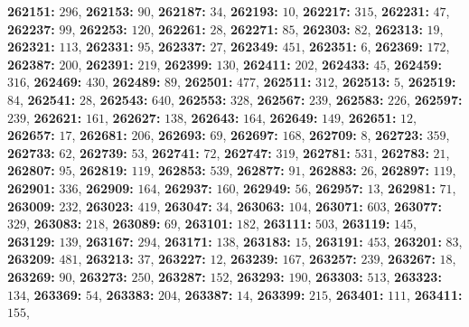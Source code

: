 \textsf{\bfseries 262151:} $296$, \textsf{\bfseries 262153:} $90$, \textsf{\bfseries 262187:} $34$, \textsf{\bfseries 262193:} $10$, \textsf{\bfseries 262217:} $315$, \textsf{\bfseries 262231:} $47$, \textsf{\bfseries 262237:} $99$, \textsf{\bfseries 262253:} $120$, \textsf{\bfseries 262261:} $28$, \textsf{\bfseries 262271:} $85$, \textsf{\bfseries 262303:} $82$, \textsf{\bfseries 262313:} $19$, \textsf{\bfseries 262321:} $113$, \textsf{\bfseries 262331:} $95$, \textsf{\bfseries 262337:} $27$, \textsf{\bfseries 262349:} $451$, \textsf{\bfseries 262351:} $6$, \textsf{\bfseries 262369:} $172$, \textsf{\bfseries 262387:} $200$, \textsf{\bfseries 262391:} $219$, \textsf{\bfseries 262399:} $130$, \textsf{\bfseries 262411:} $202$, \textsf{\bfseries 262433:} $45$, \textsf{\bfseries 262459:} $316$, \textsf{\bfseries 262469:} $430$, \textsf{\bfseries 262489:} $89$, \textsf{\bfseries 262501:} $477$, \textsf{\bfseries 262511:} $312$, \textsf{\bfseries 262513:} $5$, \textsf{\bfseries 262519:} $84$, \textsf{\bfseries 262541:} $28$, \textsf{\bfseries 262543:} $640$, \textsf{\bfseries 262553:} $328$, \textsf{\bfseries 262567:} $239$, \textsf{\bfseries 262583:} $226$, \textsf{\bfseries 262597:} $239$, \textsf{\bfseries 262621:} $161$, \textsf{\bfseries 262627:} $138$, \textsf{\bfseries 262643:} $164$, \textsf{\bfseries 262649:} $149$, \textsf{\bfseries 262651:} $12$, \textsf{\bfseries 262657:} $17$, \textsf{\bfseries 262681:} $206$, \textsf{\bfseries 262693:} $69$, \textsf{\bfseries 262697:} $168$, \textsf{\bfseries 262709:} $8$, \textsf{\bfseries 262723:} $359$, \textsf{\bfseries 262733:} $62$, \textsf{\bfseries 262739:} $53$, \textsf{\bfseries 262741:} $72$, \textsf{\bfseries 262747:} $319$, \textsf{\bfseries 262781:} $531$, \textsf{\bfseries 262783:} $21$, \textsf{\bfseries 262807:} $95$, \textsf{\bfseries 262819:} $119$, \textsf{\bfseries 262853:} $539$, \textsf{\bfseries 262877:} $91$, \textsf{\bfseries 262883:} $26$, \textsf{\bfseries 262897:} $119$, \textsf{\bfseries 262901:} $336$, \textsf{\bfseries 262909:} $164$, \textsf{\bfseries 262937:} $160$, \textsf{\bfseries 262949:} $56$, \textsf{\bfseries 262957:} $13$, \textsf{\bfseries 262981:} $71$, \textsf{\bfseries 263009:} $232$, \textsf{\bfseries 263023:} $419$, \textsf{\bfseries 263047:} $34$, \textsf{\bfseries 263063:} $104$, \textsf{\bfseries 263071:} $603$, \textsf{\bfseries 263077:} $329$, \textsf{\bfseries 263083:} $218$, \textsf{\bfseries 263089:} $69$, \textsf{\bfseries 263101:} $182$, \textsf{\bfseries 263111:} $503$, \textsf{\bfseries 263119:} $145$, \textsf{\bfseries 263129:} $139$, \textsf{\bfseries 263167:} $294$, \textsf{\bfseries 263171:} $138$, \textsf{\bfseries 263183:} $15$, \textsf{\bfseries 263191:} $453$, \textsf{\bfseries 263201:} $83$, \textsf{\bfseries 263209:} $481$, \textsf{\bfseries 263213:} $37$, \textsf{\bfseries 263227:} $12$, \textsf{\bfseries 263239:} $167$, \textsf{\bfseries 263257:} $239$, \textsf{\bfseries 263267:} $18$, \textsf{\bfseries 263269:} $90$, \textsf{\bfseries 263273:} $250$, \textsf{\bfseries 263287:} $152$, \textsf{\bfseries 263293:} $190$, \textsf{\bfseries 263303:} $513$, \textsf{\bfseries 263323:} $134$, \textsf{\bfseries 263369:} $54$, \textsf{\bfseries 263383:} $204$, \textsf{\bfseries 263387:} $14$, \textsf{\bfseries 263399:} $215$, \textsf{\bfseries 263401:} $111$, \textsf{\bfseries 263411:} $155$, 
